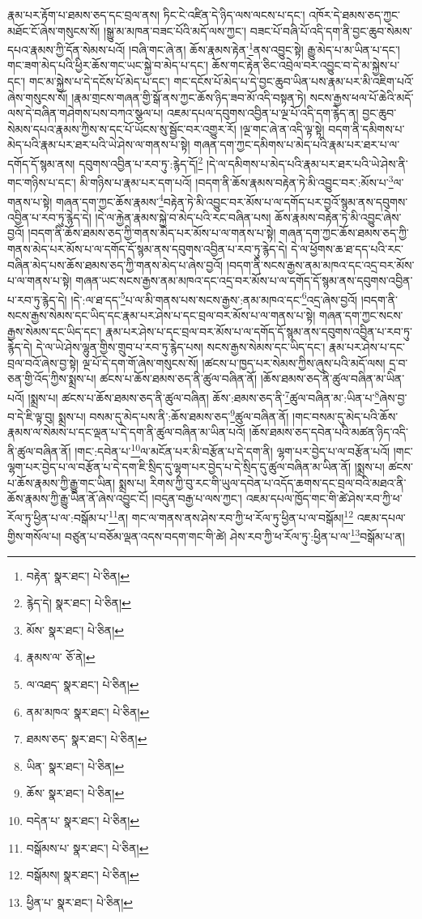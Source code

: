རྣམ་པར་རྟོག་པ་ཐམས་ཅད་དང་བྲལ་ནས། ཏིང་ངེ་འཛིན་དེ་ཉིད་ལས་ལངས་པ་དང་། འཁོར་དེ་ཐམས་ཅད་ཀྱང་མཐོང་ངོ་ཞེས་གསུངས་སོ། །སྒྱུ་མ་མཁན་བཟང་པོའི་མདོ་ལས་ཀྱང་། བཟང་པོ་བཞི་པོ་འདི་དག་ནི་བྱང་ཆུབ་སེམས་དཔའ་རྣམས་ཀྱི་དོན་སེམས་པའོ། །བཞི་གང་ཞེ་ན། ཆོས་རྣམས་རྟེན་\footnote{བརྟེན་  སྣར་ཐང་།  པེ་ཅིན། }ནས་འབྱུང་སྟེ། རྒྱུ་མེད་པ་མ་ཡིན་པ་དང་། གང་ཟག་མེད་པའི་ཕྱིར་ཆོས་གང་ཡང་སྐྱེ་བ་མེད་པ་དང་། ཆོས་གང་རྟེན་ཅིང་འབྲེལ་བར་འབྱུང་བ་དེ་མ་སྐྱེས་པ་དང་། གང་མ་སྐྱེས་པ་དེ་དངོས་པོ་མེད་པ་དང་། གང་དངོས་པོ་མེད་པ་དེ་བྱང་ཆུབ་ཡིན་པས་རྣམ་པར་མི་འཇིག་པའོ་ཞེས་གསུངས་སོ། །རྣམ་གྲངས་གཞན་གྱི་སྒོ་ནས་ཀྱང་ཆོས་ཉིད་ཟབ་མོ་འདི་བསྟན་ཏེ། སངས་རྒྱས་ཕལ་པོ་ཆེའི་མདོ་ལས་དེ་བཞིན་གཤེགས་པས་བཀའ་སྩལ་པ། འཇམ་དཔལ་དབུགས་འབྱིན་པ་ལྔ་པོ་འདི་དག་རྙེད་ན། བྱང་ཆུབ་སེམས་དཔའ་རྣམས་ཀྱིས་ས་དང་པོ་ཡོངས་སུ་སྦྱོང་བར་འགྱུར་རོ། །ལྔ་གང་ཞེ་ན་འདི་ལྟ་སྟེ། བདག་ནི་དམིགས་པ་མེད་པའི་རྣམ་པར་ཐར་པའི་ཡེ་ཤེས་ལ་གནས་པ་སྟེ། གཞན་དག་ཀྱང་དམིགས་པ་མེད་པའི་རྣམ་པར་ཐར་པ་ལ་དགོད་དོ་སྙམ་ནས། དབུགས་འབྱིན་པ་རབ་ཏུ་:རྙེད་དོ།\footnote{རྙེད་དེ།  སྣར་ཐང་།  པེ་ཅིན། } །དེ་ལ་དམིགས་པ་མེད་པའི་རྣམ་པར་ཐར་པའི་ཡེ་ཤེས་ནི་གང་གཉིས་པ་དང་། མི་གཉིས་པ་རྣམ་པར་དག་པའོ། །བདག་ནི་ཆོས་རྣམས་བརྟེན་ཏེ་མི་འབྱུང་བར་:མོས་པ་\footnote{མོས་  སྣར་ཐང་།  པེ་ཅིན། }ལ་གནས་པ་སྟེ། གཞན་དག་ཀྱང་ཆོས་རྣམས་\footnote{རྣམས་ལ་  ཅོ་ནེ། }བརྟེན་ཏེ་མི་འབྱུང་བར་མོས་པ་ལ་དགོད་པར་བྱའོ་སྙམ་ནས་དབུགས་འབྱིན་པ་རབ་ཏུ་རྙེད་དེ། །དེ་ལ་རྐྱེན་རྣམས་སྐྱེ་བ་མེད་པའི་རང་བཞིན་པས། ཆོས་རྣམས་བརྟེན་ཏེ་མི་འབྱུང་ཞེས་བྱའོ། །བདག་ནི་ཆོས་ཐམས་ཅད་ཀྱི་གནས་མེད་པར་མོས་པ་ལ་གནས་པ་སྟེ། གཞན་དག་ཀྱང་ཆོས་ཐམས་ཅད་ཀྱི་གནས་མེད་པར་མོས་པ་ལ་དགོད་དོ་སྙམ་ནས་དབུགས་འབྱིན་པ་རབ་ཏུ་རྙེད་དེ། དེ་ལ་ཕྱོགས་ཆ་ཐ་དད་པའི་རང་བཞིན་མེད་པས་ཆོས་ཐམས་ཅད་ཀྱི་གནས་མེད་པ་ཞེས་བྱའོ། །བདག་ནི་སངས་རྒྱས་ནམ་མཁའ་དང་འདྲ་བར་མོས་པ་ལ་གནས་པ་སྟེ། གཞན་ཡང་སངས་རྒྱས་ནམ་མཁའ་དང་འདྲ་བར་མོས་པ་ལ་དགོད་དོ་སྙམ་ནས་དབུགས་འབྱིན་པ་རབ་ཏུ་རྙེད་དེ། །དེ་:ལ་ཐ་དད་\footnote{ལ་འཐད་  སྣར་ཐང་།  པེ་ཅིན། }པ་ལ་མི་གནས་པས་སངས་རྒྱས་:ནམ་མཁའ་དང་\footnote{ནམ་མཁའ་  སྣར་ཐང་།  པེ་ཅིན། }འདྲ་ཞེས་བྱའོ། །བདག་ནི་སངས་རྒྱས་སེམས་དང་ཡིད་དང་རྣམ་པར་ཤེས་པ་དང་བྲལ་བར་མོས་པ་ལ་གནས་པ་སྟེ། གཞན་དག་ཀྱང་སངས་རྒྱས་སེམས་དང་ཡིད་དང་། རྣམ་པར་ཤེས་པ་དང་བྲལ་བར་མོས་པ་ལ་དགོད་དོ་སྙམ་ནས་དབུགས་འབྱིན་པ་རབ་ཏུ་རྙེད་དེ། དེ་ལ་ཡེ་ཤེས་ལྷུན་གྱིས་གྲུབ་པ་རབ་ཏུ་རྙེད་པས། སངས་རྒྱས་སེམས་དང་ཡིད་དང་། རྣམ་པར་ཤེས་པ་དང་བྲལ་བའོ་ཞེས་བྱ་སྟེ། ལྔ་པོ་དེ་དག་གོ་ཞེས་གསུངས་སོ། །ཚངས་པ་ཁྱད་པར་སེམས་ཀྱིས་ཞུས་པའི་མདོ་ལས། དྲ་བ་ཅན་གྱི་འོད་ཀྱིས་སྨྲས་པ། ཚངས་པ་ཆོས་ཐམས་ཅད་ནི་ཚུལ་བཞིན་ནོ། །ཆོས་ཐམས་ཅད་ནི་ཚུལ་བཞིན་མ་ཡིན་པའོ། །སྨྲས་པ། ཚངས་པ་ཆོས་ཐམས་ཅད་ནི་ཚུལ་བཞིན། ཆོས་:ཐམས་ཅད་ནི་\footnote{ཐམས་ཅད་  སྣར་ཐང་།  པེ་ཅིན། }ཚུལ་བཞིན་མ་:ཡིན་པ་\footnote{ཡིན་  སྣར་ཐང་།  པེ་ཅིན། }ཞེས་བྱ་བ་དེ་ཇི་ལྟ་བུ། སྨྲས་པ། བསམ་དུ་མེད་པས་ནི་:ཆོས་ཐམས་ཅད་\footnote{ཆོས་  སྣར་ཐང་།  པེ་ཅིན། }ཚུལ་བཞིན་ནོ། །གང་བསམ་དུ་མེད་པའི་ཆོས་རྣམས་ལ་སེམས་པ་དང་ལྡན་པ་དེ་དག་ནི་ཚུལ་བཞིན་མ་ཡིན་པའོ། །ཆོས་ཐམས་ཅད་དབེན་པའི་མཚན་ཉིད་འདི་ནི་ཚུལ་བཞིན་ནོ། །གང་:དབེན་པ་\footnote{བདེན་པ་  སྣར་ཐང་།  པེ་ཅིན། }ལ་མངོན་པར་མི་བརྩོན་པ་དེ་དག་ནི། ལྷག་པར་བྱེད་པ་ལ་བརྩོན་པའོ། །གང་ལྷག་པར་བྱེད་པ་ལ་བརྩོན་པ་དེ་དག་ཇི་སྲིད་དུ་ལྷག་པར་བྱེད་པ་དེ་སྲིད་དུ་ཚུལ་བཞིན་མ་ཡིན་ནོ། །སྨྲས་པ། ཚངས་པ་ཆོས་རྣམས་ཀྱི་རྒྱུ་གང་ཡིན། སྨྲས་པ། རིགས་ཀྱི་བུ་རང་གི་ཡུལ་དབེན་པ་འདོད་ཆགས་དང་བྲལ་བའི་མཐའ་ནི་ཆོས་རྣམས་ཀྱི་རྒྱུ་ཡིན་ནོ་ཞེས་འབྱུང་ངོ། །བདུན་བརྒྱ་པ་ལས་ཀྱང་། འཇམ་དཔལ་ཁྱོད་གང་གི་ཚེ་ཤེས་རབ་ཀྱི་ཕ་རོལ་ཏུ་ཕྱིན་པ་ལ་:བསྒོམ་པ་\footnote{བསྒོམས་པ་  སྣར་ཐང་།  པེ་ཅིན། }ན། གང་ལ་གནས་ནས་ཤེས་རབ་ཀྱི་ཕ་རོལ་ཏུ་ཕྱིན་པ་ལ་བསྒོམ།\footnote{བསྒོམས།  སྣར་ཐང་།  པེ་ཅིན། } འཇམ་དཔལ་གྱིས་གསོལ་པ། བཙུན་པ་བཅོམ་ལྡན་འདས་བདག་གང་གི་ཚེ། ཤེས་རབ་ཀྱི་ཕ་རོལ་ཏུ་:ཕྱིན་པ་ལ་\footnote{ཕྱིན་པ་  སྣར་ཐང་།  པེ་ཅིན། }བསྒོམ་པ་ན། 